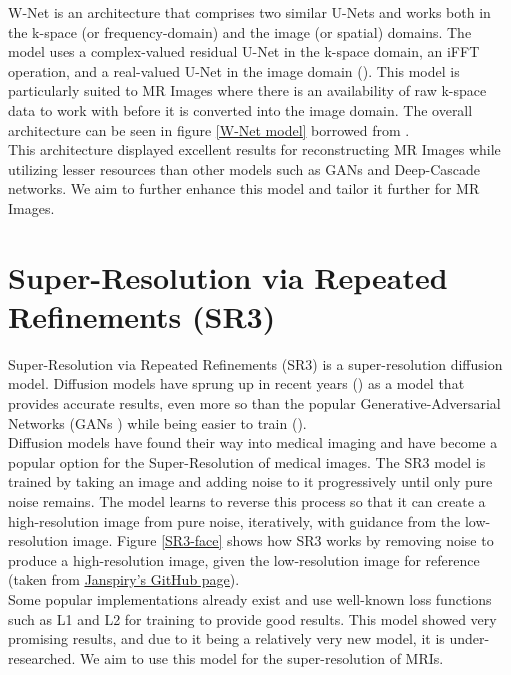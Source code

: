 W-Net is an architecture that comprises two similar U-Nets and works both in the k-space (or frequency-domain) and the image (or spatial) domains. The model uses a complex-valued residual U-Net in the k-space domain, an iFFT operation, and a real-valued U-Net in the image domain (\cite{8919674}). This model is particularly suited to MR Images where there is an availability of raw k-space data to work with before it is converted into the image domain. The overall architecture can be seen in figure \ref{W-Net model} borrowed from \cite{xia2017wnet}.\\



This architecture displayed excellent results for reconstructing MR Images while utilizing lesser resources than other models such as GANs and Deep-Cascade networks. We aim to further enhance this model and tailor it further for MR Images.


\section{Super-Resolution via Repeated Refinements (SR3)}

Super-Resolution via Repeated Refinements (SR3) is a super-resolution diffusion model. Diffusion models have sprung up in recent years (\cite{saharia2021image}) as a model that provides accurate results, even more so than the popular Generative-Adversarial Networks (GANs \cite{goodfellow2014generative}) while being easier to train (\cite{dhariwal2021diffusion}).\\

Diffusion models have found their way into medical imaging and have become a popular option for the Super-Resolution of medical images. The SR3 model is trained by taking an image and adding noise to it progressively until only pure noise remains. The model learns to reverse this process so that it can create a high-resolution image from pure noise, iteratively, with guidance from the low-resolution image. Figure \ref{SR3-face} shows how SR3 works by removing noise to produce a high-resolution image, given the low-resolution image for reference (taken from \underline{\href{https://github.com/Janspiry/Image-Super-Resolution-via-Iterative-Refinement}{Janspiry's GitHub page}}).\\




Some popular implementations already exist and use well-known loss functions such as L1 and L2 for training to provide good results. This model showed very promising results, and due to it being a relatively very new model, it is under-researched. We aim to use this model for the super-resolution of MRIs.

